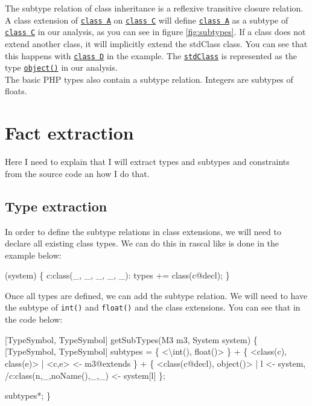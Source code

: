 \documentclass[../main.tex]{subfiles}
\begin{document}
    The subtype relation of class inheritance is a \gls{reflexive transitive closure} relation.
    A class extension of \underline{\texttt{class A}} on \underline{\texttt{class C}} will define \underline{\texttt{class A}} as a subtype of \underline{\texttt{class C}} in our analysis, as you can see in figure \ref{fig:subtypes}.
    If a class does not extend another class, it will implicitly extend the \gls{stdClass} class.
    You can see that this happens with \underline{\texttt{class D}} in the example.
    The \underline{\texttt{stdClass}} is represented as the type \underline{\texttt{object()}} in our analysis.
    \\
    The basic PHP types also contain a subtype relation.
    Integers are subtypes of floats.
    
    
    \section{Fact extraction}
    Here I need to explain that I will extract types and subtypes and constraints from the source code an how I do that.
    
    \subsection{Type extraction}
    In order to define the subtype relations in class extensions, we will need to declare all existing class types.
    We can do this in rascal like is done in the example below:
    \begin{rascal}
 (system) \{{}
     c:class(\_{}, \_{}, \_{}, \_{}, \_{}): types += class(c@decl);
\}{}
    \end{rascal}
    Once all types are defined, we can add the subtype relation. We will need to have the subtype of \texttt{int()} and \texttt{float()} and the class extensions.
    You can see that in the code below:
    \begin{rascal}
 [TypeSymbol, TypeSymbol] getSubTypes(M3 m3, System system) 
\{{}
    [TypeSymbol, TypeSymbol] subtypes
        = \{{} \textless{}\textbackslash{}int(), float()\textgreater{} \}{} 
        + \{{} \textless{}class(c), class(e)\textgreater{} | \textless{}c,e\textgreater{} \textless{}- m3@extends \}{}
        + \{{} \textless{}class(c@decl), object()\textgreater{} | l \textless{}- system, /c:class(n,\_{},noName(),\_{},\_{}) \textless{}- system{}[l] \}{};
        
     subtypes*;        
\}{}
    \end{rascal}
    
\end{document}
